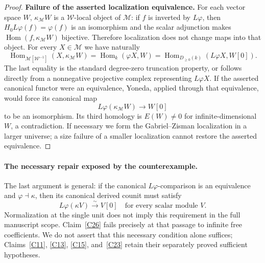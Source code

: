 \begin{proof}
\textbf{Failure of the asserted localization equivalence.}
For each vector space $W$, $\kappa_{\mathcal M}W$ is a $\mathcal W$-local object of $\mathcal M$: if $f$ is inverted by $L\varphi$, then $H_0L\varphi(f)=\varphi(f)$ is an isomorphism and the scalar adjunction makes $\operatorname{Hom}(f,\kappa_{\mathcal M}W)$ bijective. Therefore localization does not change maps into that object. For every $X\in\mathcal M$ we have naturally
\[
\operatorname{Hom}_{\mathcal M[\mathcal W^{-1}]}(X,\kappa_{\mathcal M}W)
=\operatorname{Hom}_k(\varphi X,W)
=\operatorname{Hom}_{D_{\geq0}(k)}(L\varphi X,W[0]).
\]
The last equality is the standard degree-zero truncation property, or follows directly from a nonnegative projective complex representing $L\varphi X$. If the asserted canonical functor were an equivalence, Yoneda, applied through that equivalence, would force its canonical map
\[
L\varphi(\kappa_{\mathcal M}W)\longrightarrow W[0]
\]
to be an isomorphism. Its third homology is $E(W)\ne0$ for infinite-dimensional $W$, a contradiction. If necessary we form the Gabriel--Zisman localization in a larger universe; a size failure of a smaller localization cannot restore the asserted equivalence.
\end{proof}


\paragraph{The necessary repair exposed by the counterexample.}
The last argument is general: if the canonical $L\varphi$-comparison is an equivalence and $\varphi\dashv\kappa$, then its canonical derived counit must satisfy
\[
L\varphi(\kappa V)\xrightarrow{\sim}V[0]
\quad\text{for every scalar module }V.
\]
Normalization at the single unit does not imply this requirement in the full manuscript scope. Claim~\ref{C26} fails precisely at that passage to infinite free coefficients. We do not assert that this necessary condition alone suffices; Claims~\ref{C11}, \ref{C13}, \ref{C15}, and~\ref{C23} retain their separately proved sufficient hypotheses.
